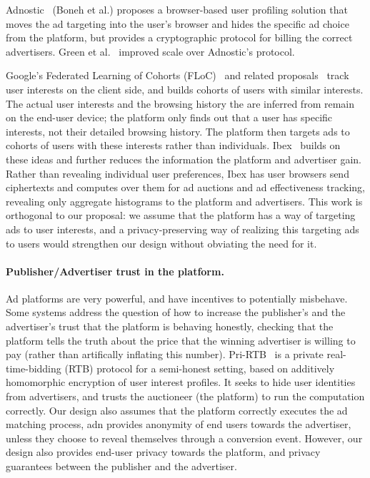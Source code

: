 %
Adnostic~\cite{adnostic} (Boneh et al.) proposes a browser-based user profiling
solution that moves the ad targeting into the user's browser and hides the
specific ad choice from the platform, but provides a cryptographic protocol for
billing the correct advertisers.
%
Green et al.~\cite{adnostic+} improved scale over Adnostic's protocol.
%
%

%
Google's Federated Learning of Cohorts (FLoC)~\cite{google-floc} and related
proposals~\cite{google-topic-based} track user interests
on the client side, and builds cohorts of users with similar interests.
%
The actual user interests and the browsing history the are inferred from remain
on the end-user device; the platform only finds out that a user has specific
interests, not their detailed browsing history.
%
The platform then targets ads to cohorts of users with these interests rather
than individuals.
%
Ibex~\cite{ibex} builds on these ideas and further reduces the information the platform
and advertiser gain.
%
Rather than revealing individual user preferences, Ibex has user browsers send
ciphertexts and computes over them for ad auctions and ad effectiveness tracking,
revealing only aggregate histograms to the platform and advertisers.
%
This work is orthogonal to our proposal: we assume that the platform has a way
of targeting ads to user interests, and a privacy-preserving way of realizing this
targeting ads to users would strengthen our design without obviating the need for it.
%

\paragraph{Publisher/Advertiser trust in the platform.}
%
Ad platforms are very powerful, and have incentives to potentially misbehave.
%
Some systems address the question of how to increase the publisher's and the advertiser's trust that the platform is behaving honestly, checking \eg that the platform tells the truth about the price that the winning advertiser is willing to pay (rather than artifically inflating this number).
%
%
Pri-RTB~\cite{pri-rtb} is a private real-time-bidding (RTB) protocol for a
semi-honest setting, based on additively homomorphic encryption of user interest
profiles.
%
It seeks to hide user identities from advertisers, and trusts the
auctioneer (the platform) to run the computation correctly.
%
Our design also assumes that the platform correctly executes the ad matching process,
adn provides anonymity of end users towards the advertiser, unless they choose to
reveal themselves through a conversion event.
%
However, our design also provides end-user privacy towards the platform, and privacy
guarantees between the publisher and the advertiser.
%

